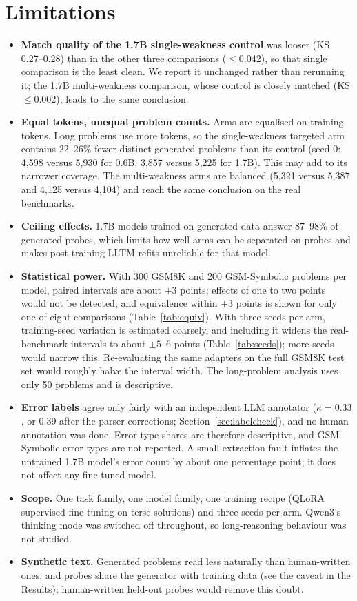 \documentclass[11pt]{article}
\begin{document}
\section{Limitations}
\label{sec:limits}
\begin{itemize}
  \item \textbf{Match quality of the 1.7B single-weakness control} was looser (KS 0.27--0.28) than in the other three
  comparisons ($\le$0.042), so that single comparison is the least clean. We report it unchanged rather than rerunning
  it; the 1.7B multi-weakness comparison, whose control is closely matched (KS $\le$0.002), leads to the same
  conclusion.
  \item \textbf{Equal tokens, unequal problem counts.} Arms are equalised on training tokens. Long problems use more
  tokens, so the single-weakness targeted arm contains 22--26\% fewer distinct generated problems than its control (seed
  0: 4{,}598 versus 5{,}930 for 0.6B, 3{,}857 versus 5{,}225 for 1.7B). This may add to its narrower coverage. The
  multi-weakness arms are balanced (5{,}321 versus 5{,}387 and 4{,}125 versus 4{,}104) and reach the same conclusion on
  the real benchmarks.
  \item \textbf{Ceiling effects.} 1.7B models trained on generated data answer 87--98\% of generated probes, which limits how well arms
  can be separated on probes and makes post-training LLTM refits unreliable for that model.
  \item \textbf{Statistical power.} With 300 GSM8K and 200 GSM-Symbolic problems per model, paired intervals are about
  $\pm3$ points; effects of one to two points would not be detected, and equivalence within $\pm3$ points is shown for
  only one of eight comparisons (Table~\ref{tab:equiv}). With three seeds per arm, training-seed variation is
  estimated coarsely, and including it widens the real-benchmark intervals to about $\pm5$--6 points (Table~\ref{tab:seeds}); more seeds
  would narrow this. Re-evaluating the same adapters on the full GSM8K test set
  would roughly halve the interval width. The long-problem analysis uses only 50 problems and is descriptive.
  \item \textbf{Error labels} agree only fairly with an independent LLM annotator ($\kappa = 0.33$, or 0.39 after the parser
  corrections;
  Section~\ref{sec:labelcheck}), and no human annotation was done. Error-type shares are therefore descriptive, and
  GSM-Symbolic error types are not reported. A small extraction fault inflates the untrained 1.7B model's error count
  by about one percentage point; it does not affect any fine-tuned model.
  \item \textbf{Scope.} One task family, one model family, one training recipe (QLoRA supervised fine-tuning on terse
  solutions) and three seeds per arm. Qwen3's thinking mode was switched off throughout, so long-reasoning behaviour was
  not studied.
  \item \textbf{Synthetic text.} Generated problems read less naturally than human-written ones, and probes share the
  generator with training data (see the caveat in the Results); human-written held-out probes would remove this doubt.
\end{itemize}
\end{document}
